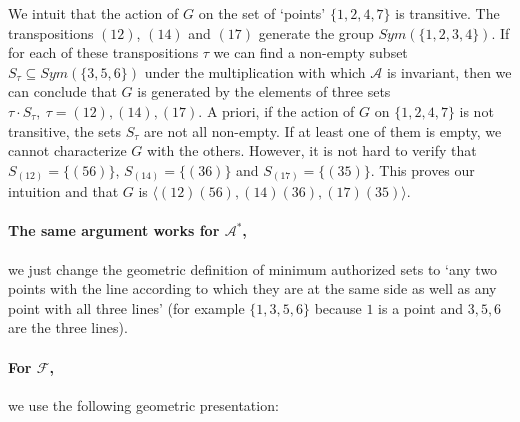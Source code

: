 \documentclass[11pt, a4paper]{kybernetika}
\begin{document}
{		We intuit that the action of $G$ on the set of `points' $\{1,2,4,7\}$ is transitive. The transpositions $(12)$, $(14)$ and $(17)$ generate the group $Sym(\{1,2,3,4\})$. If for each of these transpositions $\tau$ we can find a non-empty subset $S_\tau\subseteq Sym(\{3,5,6\})$ under the multiplication  with which $\mathcal{A}$ is invariant, then we can conclude that $G$ is generated by the elements of three sets $\tau\cdot S_\tau,\ \tau=(12),(14),(17)$. A priori, if the action of $G$ on $\{1,2,4,7\}$ is not transitive, the sets $S_\tau$ are not all non-empty. If at least one of them is empty, we cannot characterize $G$ with the others. However, it is not hard to verify that $S_{(12)}=\{(56)\}$, $S_{(14)}=\{(36)\}$ and $S_{(17)}=\{(35)\}$. This proves our intuition and that $G$ is $\langle(12)(56),(14)(36),(17)(35)\rangle$.
		
		\paragraph{The same argument works for $\mathcal{A}^*$,} we just change the geometric definition of minimum authorized sets to `any two points with the line according to which they are at the same side as well as any point with all three lines' (for example $\{1,3,5,6\}$ because $1$ is a point and $3,5,6$ are the three lines).
		
		\paragraph{For $\mathcal{F}$,} we use the following geometric presentation:
		
		\smallskip
		
		
		\smallskip
		
}
\end{document}
